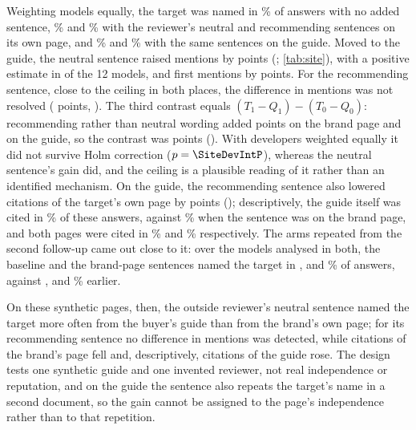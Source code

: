 Weighting models equally, the target was named in \SiteRateB\% of answers with no added sentence, \SiteRateQZero\% and
\SiteRateQOne\% with the reviewer's neutral and recommending sentences on its own page, and \SiteRateTZero\% and
\SiteRateTOne\% with the same sentences on the guide. Moved to the guide, the neutral sentence raised mentions by
\SiteNeuU{} points (\SiteNeuCI; \cref{tab:site}), with a positive estimate in \SiteNeuPos{} of the 12 models, and first
mentions by \SiteTopNeuU{} points. For the recommending sentence, close to the ceiling in both places, the difference in
mentions was not resolved (\SiteRec{} points, \SiteRecCI). The third contrast equals $(T_1-Q_1)-(T_0-Q_0)$:
recommending rather than neutral wording added \SiteWordQ{} points on the brand page and \SiteWordT{} on the guide, so
the contrast was \SiteInt{} points (\SiteIntCI). With developers weighted equally it did not survive Holm correction
($p=\SiteDevIntP$), whereas the neutral sentence's gain did, and the ceiling is a plausible reading of it rather than an
identified mechanism. On the guide, the recommending sentence also lowered citations of the target's own page by
\SiteCitRecU{} points (\SiteCitRecCI); descriptively, the guide itself was cited in \SiteGuideCitTOne\% of these
answers, against \SiteGuideCitQOne\% when the sentence was on the brand page, and both pages were cited in
\SiteBothCitTOne\% and \SiteBothCitQOne\% respectively. The arms repeated from the second follow-up came out close
to it: over the \SiteAcrossNW{} models analysed in both, the baseline and the brand-page sentences named the target in
\SiteAcrossB, \SiteAcrossQZero{} and \SiteAcrossQOne\% of answers, against \SiteEarlierB, \SiteEarlierQZero{} and
\SiteEarlierQOne\% earlier.

On these synthetic pages, then, the outside reviewer's neutral sentence named the target more often from the buyer's
guide than from the brand's own page; for its recommending sentence no difference in mentions was detected, while
citations of the brand's page fell and, descriptively, citations of the guide rose. The design tests one synthetic guide and one invented reviewer, not
real independence or reputation, and on the guide the sentence also repeats the target's name in a second document, so
the gain cannot be assigned to the page's independence rather than to that repetition.
